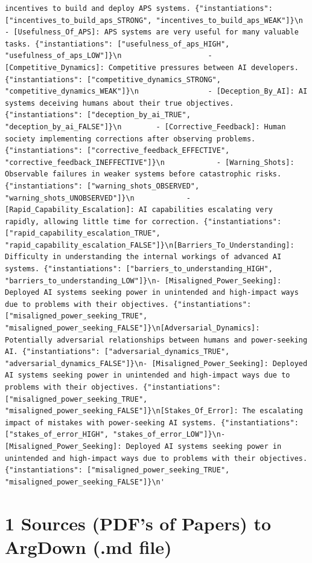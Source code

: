 \documentclass[
  11pt,
  letterpaper,
]{book}
\begin{document}
\begin{verbatim}
incentives to build and deploy APS systems. {"instantiations": ["incentives_to_build_aps_STRONG", "incentives_to_build_aps_WEAK"]}\n                    - [Usefulness_Of_APS]: APS systems are very useful for many valuable tasks. {"instantiations": ["usefulness_of_aps_HIGH", "usefulness_of_aps_LOW"]}\n                    - [Competitive_Dynamics]: Competitive pressures between AI developers. {"instantiations": ["competitive_dynamics_STRONG", "competitive_dynamics_WEAK"]}\n                - [Deception_By_AI]: AI systems deceiving humans about their true objectives. {"instantiations": ["deception_by_ai_TRUE", "deception_by_ai_FALSE"]}\n        - [Corrective_Feedback]: Human society implementing corrections after observing problems. {"instantiations": ["corrective_feedback_EFFECTIVE", "corrective_feedback_INEFFECTIVE"]}\n            - [Warning_Shots]: Observable failures in weaker systems before catastrophic risks. {"instantiations": ["warning_shots_OBSERVED", "warning_shots_UNOBSERVED"]}\n            - [Rapid_Capability_Escalation]: AI capabilities escalating very rapidly, allowing little time for correction. {"instantiations": ["rapid_capability_escalation_TRUE", "rapid_capability_escalation_FALSE"]}\n[Barriers_To_Understanding]: Difficulty in understanding the internal workings of advanced AI systems. {"instantiations": ["barriers_to_understanding_HIGH", "barriers_to_understanding_LOW"]}\n- [Misaligned_Power_Seeking]: Deployed AI systems seeking power in unintended and high-impact ways due to problems with their objectives. {"instantiations": ["misaligned_power_seeking_TRUE", "misaligned_power_seeking_FALSE"]}\n[Adversarial_Dynamics]: Potentially adversarial relationships between humans and power-seeking AI. {"instantiations": ["adversarial_dynamics_TRUE", "adversarial_dynamics_FALSE"]}\n- [Misaligned_Power_Seeking]: Deployed AI systems seeking power in unintended and high-impact ways due to problems with their objectives. {"instantiations": ["misaligned_power_seeking_TRUE", "misaligned_power_seeking_FALSE"]}\n[Stakes_Of_Error]: The escalating impact of mistakes with power-seeking AI systems. {"instantiations": ["stakes_of_error_HIGH", "stakes_of_error_LOW"]}\n- [Misaligned_Power_Seeking]: Deployed AI systems seeking power in unintended and high-impact ways due to problems with their objectives. {"instantiations": ["misaligned_power_seeking_TRUE", "misaligned_power_seeking_FALSE"]}\n'
\end{verbatim}

\chapter{1 Sources (PDF's of Papers) to ArgDown (.md
file)}\label{sources-pdfs-of-papers-to-argdown-.md-file}
\end{document}
